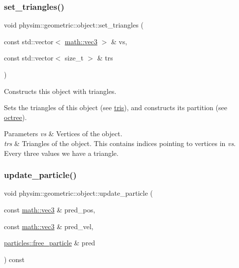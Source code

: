 \subsubsection{\texorpdfstring{set\+\_\+triangles()}{set\_triangles()}}
{\footnotesize\ttfamily void physim\+::geometric\+::object\+::set\+\_\+triangles (\begin{DoxyParamCaption}\item[{const std\+::vector$<$ \hyperlink{structphysim_1_1math_1_1vec3}{math\+::vec3} $>$ \&}]{vs,  }\item[{const std\+::vector$<$ size\+\_\+t $>$ \&}]{trs }\end{DoxyParamCaption})}



Constructs this object with triangles. 

Sets the triangles of this object (see \hyperlink{classphysim_1_1geometric_1_1object_a0a7ba3bc4dda95651acdc046342e437c}{tris}), and constructs its partition (see \hyperlink{classphysim_1_1geometric_1_1object_a4f588a490ec8a223b5229c6e7dba5295}{octree}). 
\begin{DoxyParams}{Parameters}
{\em vs} & Vertices of the object. \\
\hline
{\em trs} & Triangles of the object. This contains indices pointing to vertices in {\itshape vs}. Every three values we have a triangle. \\
\hline
\end{DoxyParams}
\mbox{\label{classphysim_1_1geometric_1_1object_a9885341b8bad60413402d84249bea9a2}} 
\subsubsection{\texorpdfstring{update\+\_\+particle()}{update\_particle()}\hspace{0.1cm}{\footnotesize\ttfamily [1/4]}}
{\footnotesize\ttfamily void physim\+::geometric\+::object\+::update\+\_\+particle (\begin{DoxyParamCaption}\item[{const \hyperlink{structphysim_1_1math_1_1vec3}{math\+::vec3} \&}]{pred\+\_\+pos,  }\item[{const \hyperlink{structphysim_1_1math_1_1vec3}{math\+::vec3} \&}]{pred\+\_\+vel,  }\item[{\hyperlink{classphysim_1_1particles_1_1free__particle}{particles\+::free\+\_\+particle} \&}]{pred }\end{DoxyParamCaption}) const\hspace{0.3cm}{\ttfamily [virtual]}}



